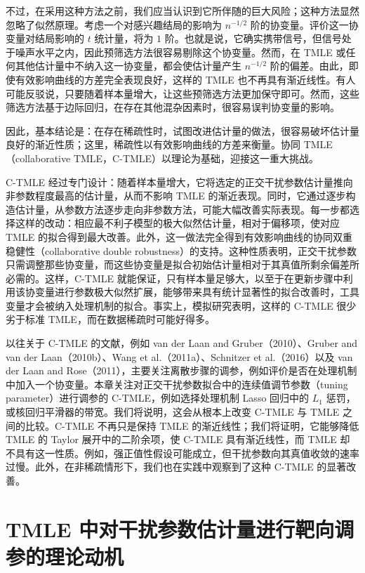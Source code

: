 不过，在采用这种方法之前，我们应当认识到它所伴随的巨大风险；这种方法显然忽略了似然原理。考虑一个对感兴趣结局的影响为 $n^{-1/2}$ 阶的协变量。评价这一协变量对结局影响的 $t$ 统计量，将为 $1$ 阶。也就是说，它确实携带信号，但信号处于噪声水平之内，因此预筛选方法很容易剔除这个协变量。然而，在 TMLE 或任何其他估计量中不纳入这一协变量，都会使估计量产生 $n^{-1/2}$ 阶的偏差。由此，即使有效影响曲线的方差完全表现良好，这样的 TMLE 也不再具有渐近线性。有人可能反驳说，只要随着样本量增大，让这些预筛选方法更加保守即可。然而，这些筛选方法基于边际回归，在存在其他混杂因素时，很容易误判协变量的影响。

\begin{sourcebox}
因此，基本结论是：在存在稀疏性时，试图改进估计量的做法，很容易破坏估计量良好的渐近性质；这里，稀疏性以有效影响曲线的方差来衡量。协同 TMLE（collaborative TMLE，C-TMLE）以理论为基础，迎接这一重大挑战。
\end{sourcebox}

C-TMLE 经过专门设计：随着样本量增大，它将选定的正交干扰参数估计量推向非参数程度最高的估计量，从而不影响 TMLE 的渐近表现。同时，它通过逐步构造估计量，从参数方法逐步走向非参数方法，可能大幅改善实际表现。每一步都选择这样的改动：相应最不利子模型的极大似然估计量，相对于偏移项，使对应 TMLE 的拟合得到最大改善。此外，这一做法完全得到有效影响曲线的协同双重稳健性（collaborative double robustness）的支持。这种性质表明，正交干扰参数只需调整那些协变量，而这些协变量是拟合初始估计量相对于其真值所剩余偏差所必需的。这样，C-TMLE 就能保证，只有样本量足够大，以至于在更新步骤中利用该协变量进行参数极大似然扩展，能够带来具有统计显著性的拟合改善时，工具变量才会被纳入处理机制的拟合。事实上，模拟研究表明，这样的 C-TMLE 很少劣于标准 TMLE，而在数据稀疏时可能好得多。

以往关于 C-TMLE 的文献，例如 van der Laan and Gruber（2010）、Gruber and van der Laan（2010b）、Wang et al.（2011a）、Schnitzer et al.（2016）以及 van der Laan and Rose（2011），主要关注离散步骤的调参，例如评价是否在处理机制中加入一个协变量。本章关注对正交干扰参数拟合中的连续值调节参数（tuning parameter）进行调参的 C-TMLE，例如选择处理机制 Lasso 回归中的 $L_1$ 惩罚，或核回归平滑器的带宽。我们将说明，这会从根本上改变 C-TMLE 与 TMLE 之间的比较。C-TMLE 不再只是保持 TMLE 的渐近线性；我们将证明，它能够降低 TMLE 的 Taylor 展开中的二阶余项，使 C-TMLE 具有渐近线性，而 TMLE 却不具有这一性质。例如，强正值性假设可能成立，但干扰参数向其真值收敛的速率过慢。此外，在非稀疏情形下，我们也在实践中观察到了这种 C-TMLE 的显著改善。

\section{TMLE 中对干扰参数估计量进行靶向调参的理论动机}
\label{sec:ch10-motivation}

